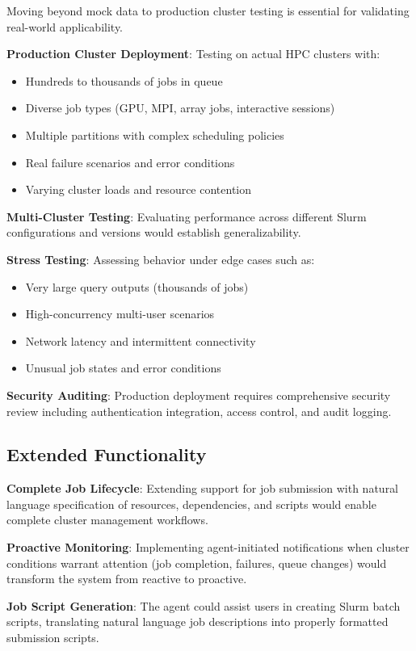 Moving beyond mock data to production cluster testing is essential for validating real-world applicability.

\textbf{Production Cluster Deployment}: Testing on actual HPC clusters with:
\begin{itemize}
    \item Hundreds to thousands of jobs in queue
    \item Diverse job types (GPU, MPI, array jobs, interactive sessions)
    \item Multiple partitions with complex scheduling policies
    \item Real failure scenarios and error conditions
    \item Varying cluster loads and resource contention
\end{itemize}

\textbf{Multi-Cluster Testing}: Evaluating performance across different Slurm configurations and versions would establish generalizability.

\textbf{Stress Testing}: Assessing behavior under edge cases such as:
\begin{itemize}
    \item Very large query outputs (thousands of jobs)
    \item High-concurrency multi-user scenarios
    \item Network latency and intermittent connectivity
    \item Unusual job states and error conditions
\end{itemize}

\textbf{Security Auditing}: Production deployment requires comprehensive security review including authentication integration, access control, and audit logging.

\subsection{Extended Functionality}

\textbf{Complete Job Lifecycle}: Extending support for job submission with natural language specification of resources, dependencies, and scripts would enable complete cluster management workflows.

\textbf{Proactive Monitoring}: Implementing agent-initiated notifications when cluster conditions warrant attention (job completion, failures, queue changes) would transform the system from reactive to proactive.

\textbf{Job Script Generation}: The agent could assist users in creating Slurm batch scripts, translating natural language job descriptions into properly formatted submission scripts.

